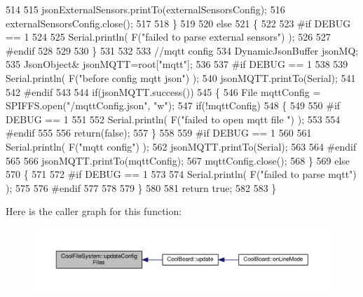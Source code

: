 \begin{DoxyCode}
514 
515         jsonExternalSensors.printTo(externalSensorsConfig); 
516         externalSensorsConfig.close();
517 
518     \}
519 
520     \textcolor{keywordflow}{else}
521     \{   
522 
523 \textcolor{preprocessor}{    #if DEBUG == 1}
524         
525         Serial.println( F(\textcolor{stringliteral}{"failed to parse external sensors"}) );
526 
527 \textcolor{preprocessor}{    #endif}
528 
529 
530     \}
531 
532     
533     \textcolor{comment}{//mqtt config}
534     DynamicJsonBuffer jsonMQ;
535         JsonObject& jsonMQTT=root[\textcolor{stringliteral}{"mqtt"}];
536     
537 \textcolor{preprocessor}{#if DEBUG == 1 }
538 
539     Serial.println( F(\textcolor{stringliteral}{"before config mqtt json"}) );
540     jsonMQTT.printTo(Serial);
541 
542 \textcolor{preprocessor}{#endif}
543 
544     \textcolor{keywordflow}{if}(jsonMQTT.success())
545     \{
546         File mqttConfig = SPIFFS.open(\textcolor{stringliteral}{"/mqttConfig.json"}, \textcolor{stringliteral}{"w"}); 
547         \textcolor{keywordflow}{if}(!mqttConfig)
548         \{
549         
550 \textcolor{preprocessor}{        #if DEBUG == 1 }
551 
552             Serial.println( F(\textcolor{stringliteral}{"failed to open mqtt file "}) );
553         
554 \textcolor{preprocessor}{        #endif}
555         
556             \textcolor{keywordflow}{return}(\textcolor{keyword}{false});
557         \}
558 
559 \textcolor{preprocessor}{#if DEBUG == 1 }
560 
561         Serial.println( F(\textcolor{stringliteral}{"mqtt config"}) );
562         jsonMQTT.printTo(Serial);
563 
564 \textcolor{preprocessor}{#endif}
565     
566         jsonMQTT.printTo(mqttConfig);
567         mqttConfig.close();
568     \}
569     \textcolor{keywordflow}{else}
570     \{
571 
572 \textcolor{preprocessor}{    #if DEBUG == 1 }
573 
574         Serial.println( F(\textcolor{stringliteral}{"failed to parse mqtt"}) );
575     
576 \textcolor{preprocessor}{    #endif}
577 
578     
579     \}   
580         
581     \textcolor{keywordflow}{return} \textcolor{keyword}{true};
582 
583 \}   
\end{DoxyCode}
Here is the caller graph for this function\+:
\nopagebreak
\begin{figure}[H]
\begin{center}
\leavevmode
\includegraphics[width=350pt]{classCoolFileSystem_a32dad79ae80182a83e2e8f52286b7c7b_icgraph}
\end{center}
\end{figure}


